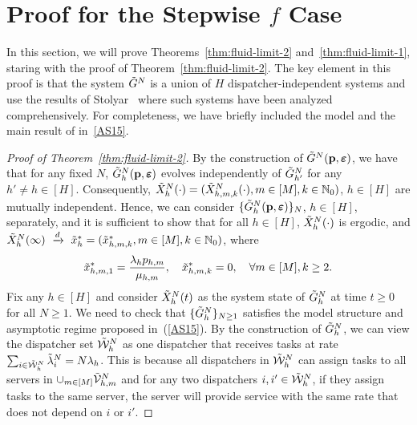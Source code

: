 \documentclass[11pt, reqno]{article}
\numberwithin{equation}{section}
\numberwithin{theorem}{section}
\newcommand{\dto}{\ensuremath{\ \xrightarrow{d} \ }}  %
\newcommand{\N}{\mathbb{N}}                 %
\begin{document}
\section{Proof for the Stepwise $f$ Case}\label{sec:proof-simple-systems}
In this section, we will prove Theorems~\ref{thm:fluid-limit-2} and~\ref{thm:fluid-limit-1}, staring with the proof of Theorem~\ref{thm:fluid-limit-2}. 
The key element in this proof is that the system $\Tilde{G}^N$ is a union of $H$ dispatcher-independent systems and use the results of Stolyar~\cite{AS15} where such systems have been analyzed comprehensively. 
For completeness, we have briefly included the model and the main result of \cite{AS15} in~\ref{AS15}.
\begin{proof}[Proof of Theorem~\ref{thm:fluid-limit-2}]
 By the construction of $\Tilde{G}^N(\mathbf{p},\boldsymbol\varepsilon)$, we have that for any fixed $N$, $\Tilde{G}^N_h(\mathbf{p},\boldsymbol\varepsilon)$ evolves independently of $\Tilde{G}^N_{h'}$ for any $h'\neq h\in[H]$. 
 Consequently, $\Tilde{X}^N_h(\cdot)=(\Tilde{X}^N_{h,m,k}(\cdot),m\in[M],k\in\N_0)$, $h\in[H]$ are mutually independent. Hence, we can consider $\{\Tilde{G}^N_h(\mathbf{p},\boldsymbol\varepsilon)\}_{N}$, $h\in[H]$, separately, and  it is sufficient to show that for all $h\in[H]$, $\Tilde{X}^N_h(\cdot)$ is ergodic, and $\Tilde{X}^N_h(\infty)\dto \Tilde{x}^*_h=(\Tilde{x}^*_{h,m,k},m\in[M],k\in \N_0)$, where \begin{equation}
    \Tilde{x}^*_{h,m,1}=\frac{\lambda_hp_{h,m}}{\mu_{h,m}},\quad \Tilde{x}^*_{h,m,k}=0,\quad \forall m\in [M],k\geq 2.
\end{equation}
Fix any $h\in[H]$ and consider $\Tilde{X}^N_h(t)$ as the system state of $\Tilde{G}^N_h$ at time $t\geq 0$ for all $N\geq 1$. 
We need to check that $\{\Tilde{G}^N_h\}_{N\geq 1}$ satisfies the model structure and asymptotic regime proposed in~\cite{AS15}(\ref{AS15}). 
By the construction of $\Tilde{G}^N_h$, we can view the dispatcher set $\Tilde{\mathcal{W}}^N_h$ as one dispatcher that receives tasks at rate $\sum_{i\in\Tilde{\mathcal{W}}^N_h}\Tilde{\lambda}^N_i=N\lambda_h$. 
This is because all dispatchers in $\Tilde{\mathcal{W}}^N_h$ can assign tasks to all servers in $\cup_{m\in[M]}\Tilde{\mathcal{V}}^N_{h,m}$ and for any two dispatchers $i,i'\in\Tilde{\mathcal{W}}^N_h$, if they assign tasks to the same server, the server will provide service with the same rate that does not depend on $i$ or $i'$. 

\end{proof}
\end{document}
